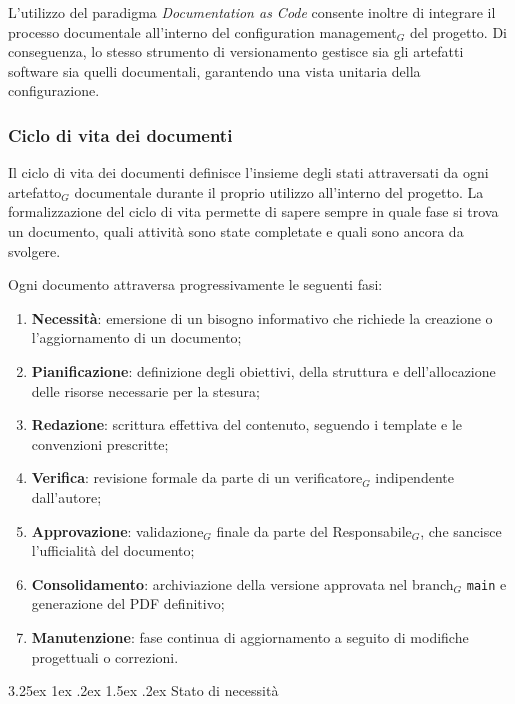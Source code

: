 \documentclass[a4paper, 10pt]{article}
\makeatletter
\renewcommand\paragraph{\@startsection{paragraph}{4}{\z@}%
  {3.25ex \@plus1ex \@minus .2ex}%
  {1.5ex \@plus .2ex}%
  {\normalfont\normalsize\bfseries}}
\makeatother
\begin{document}
L'utilizzo del paradigma \textit{Documentation as Code} consente inoltre di integrare il processo documentale all'interno del configuration management$_G$ del progetto. Di conseguenza, lo stesso strumento di versionamento gestisce sia gli artefatti software sia quelli documentali, garantendo una vista unitaria della configurazione.

\subsubsection{Ciclo di vita dei documenti}
\label{subsec:ciclo_vita_documenti}

Il ciclo di vita dei documenti definisce l'insieme degli stati attraversati da ogni artefatto$_G$ documentale durante il proprio utilizzo all'interno del progetto. La formalizzazione del ciclo di vita permette di sapere sempre in quale fase si trova un documento, quali attività sono state completate e quali sono ancora da svolgere.

Ogni documento attraversa progressivamente le seguenti fasi:
\begin{enumerate}
    \item \textbf{Necessità}: emersione di un bisogno informativo che richiede la creazione o l'aggiornamento di un documento;
    \item \textbf{Pianificazione}: definizione degli obiettivi, della struttura e dell'allocazione delle risorse necessarie per la stesura;
    \item \textbf{Redazione}: scrittura effettiva del contenuto, seguendo i template e le convenzioni prescritte;
    \item \textbf{Verifica}: revisione formale da parte di un verificatore$_G$ indipendente dall'autore;
    \item \textbf{Approvazione}: validazione$_G$ finale da parte del Responsabile$_G$, che sancisce l'ufficialità del documento;
    \item \textbf{Consolidamento}: archiviazione della versione approvata nel branch$_G$ \texttt{main} e generazione del PDF definitivo;
    \item \textbf{Manutenzione}: fase continua di aggiornamento a seguito di modifiche progettuali o correzioni.
\end{enumerate}

\paragraph{Stato di necessità}
\end{document}

